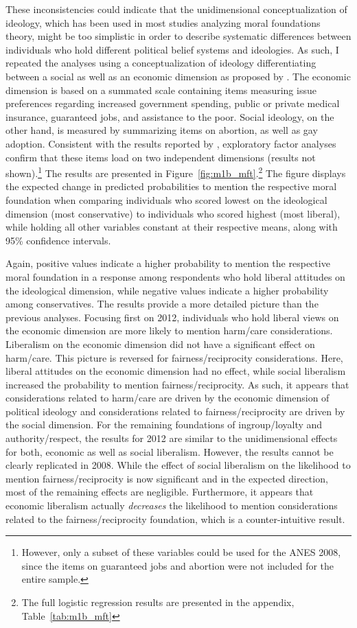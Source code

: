 \documentclass[12pt]{article}
\begin{document}
These inconsistencies could indicate that the unidimensional conceptualization of ideology, which has been used in most studies analyzing moral foundations theory, might be too simplistic in order to describe systematic differences between individuals who hold different political belief systems and ideologies. As such, I repeated the analyses using a conceptualization of ideology differentiating between a social as well as an economic dimension as proposed by \citet{feldman2013understanding}. The economic dimension is based on a summated scale containing items measuring issue preferences regarding increased government spending, public or private medical insurance, guaranteed jobs, and assistance to the poor. Social ideology, on the other hand, is measured by summarizing items on abortion, as well as gay adoption. Consistent with the results reported by \citet{feldman2013understanding}, exploratory factor analyses confirm that these items load on two independent dimensions (results not shown).\footnote{However, only a subset of these variables could be used for the ANES 2008, since the items on guaranteed jobs and abortion were not included for the entire sample.} The results are presented in Figure~\ref{fig:m1b_mft}.\footnote{The full logistic regression results are presented in the appendix, Table~\ref{tab:m1b_mft}} The figure displays the expected change in predicted probabilities to mention the respective moral foundation when comparing individuals who scored lowest on the ideological dimension (most conservative) to individuals who scored highest (most liberal), while holding all other variables constant at their respective means, along with 95\% confidence intervals.

Again, positive values indicate a higher probability to mention the respective moral foundation in a response among respondents who hold liberal attitudes on the ideological dimension, while negative values indicate a higher probability among conservatives. The results provide a more detailed picture than the previous analyses. Focusing first on 2012, individuals who hold liberal views on the economic dimension are more likely to mention harm/care considerations. Liberalism on the economic dimension did not have a significant effect on harm/care. This picture is reversed for fairness/reciprocity considerations. Here, liberal attitudes on the economic dimension had no effect, while social liberalism increased the probability to mention fairness/reciprocity. As such, it appears that considerations related to harm/care are driven by the economic dimension of political ideology and considerations related to fairness/reciprocity are driven by the social dimension. For the remaining foundations of ingroup/loyalty and authority/respect, the results for 2012 are similar to the unidimensional effects for both, economic as well as social liberalism. However, the results cannot be clearly replicated in 2008. While the effect of social liberalism on the likelihood to mention fairness/reciprocity is now significant and in the expected direction, most of the remaining effects are negligible. Furthermore, it appears that economic liberalism actually \textit{decreases} the likelihood to mention considerations related to the fairness/reciprocity foundation, which is a counter-intuitive result.
\end{document}
